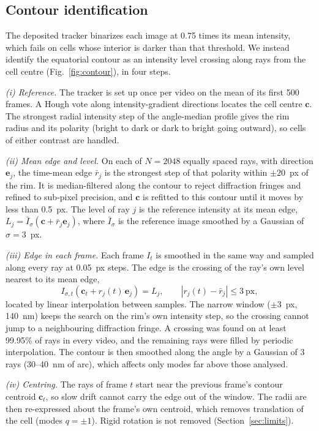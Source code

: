 \documentclass[conference]{IEEEtran}
\begin{document}
\subsection{Contour identification}
The deposited tracker binarizes each image at 0.75 times its mean intensity, which fails on cells
whose interior is darker than that threshold. We instead identify the equatorial contour as an
intensity level crossing along rays from the cell centre (Fig.~\ref{fig:contour}), in four steps.

\emph{(i) Reference.} The tracker is set up once per video on the mean of its first 500 frames. A
Hough vote along intensity-gradient directions locates the cell centre $\mathbf c$. The strongest
radial intensity step of the angle-median profile gives the rim radius and its polarity (bright to
dark or dark to bright going outward), so cells of either contrast are handled.

\emph{(ii) Mean edge and level.} On each of $N = 2048$ equally spaced rays, with direction
$\mathbf e_j$, the time-mean edge $\bar r_j$ is the strongest step of that polarity within
$\pm20$~px of the rim. It is median-filtered along the contour to reject diffraction fringes and
refined to sub-pixel precision, and $\mathbf c$ is refitted to this contour until it moves by less
than 0.5~px. The level of ray $j$ is the reference intensity at its mean edge,
$L_j = \bar I_\sigma(\mathbf c + \bar r_j\mathbf e_j)$, where $\bar I_\sigma$ is the reference image
smoothed by a Gaussian of $\sigma = 3$~px.

\emph{(iii) Edge in each frame.} Each frame $I_t$ is smoothed in the same way and sampled along every
ray at 0.05~px steps. The edge is the crossing of the ray's own level nearest to its mean edge,
\begin{equation}
I_{\sigma,t}(\mathbf c_t + r_j(t)\,\mathbf e_j) = L_j,\qquad |r_j(t) - \bar r_j| \le 3~\text{px},
\label{eq:crossing}
\end{equation}
located by linear interpolation between samples. The narrow window ($\pm3$~px, 140~nm) keeps the
search on the rim's own intensity step, so the crossing cannot jump to a neighbouring diffraction fringe. A crossing was found on at
least 99.95\% of rays in every video, and the remaining rays were filled by periodic interpolation.
The contour is then smoothed along the angle by a Gaussian of 3 rays (30--40~nm of arc), which
affects only modes far above those analysed.

\emph{(iv) Centring.} The rays of frame $t$ start near the previous frame's contour centroid
$\mathbf c_t$, so slow drift cannot carry the edge out of the window. The radii are then re-expressed
about the frame's own centroid, which removes translation of the cell (modes $q = \pm1$). Rigid
rotation is not removed (Section~\ref{sec:limits}).
\end{document}
